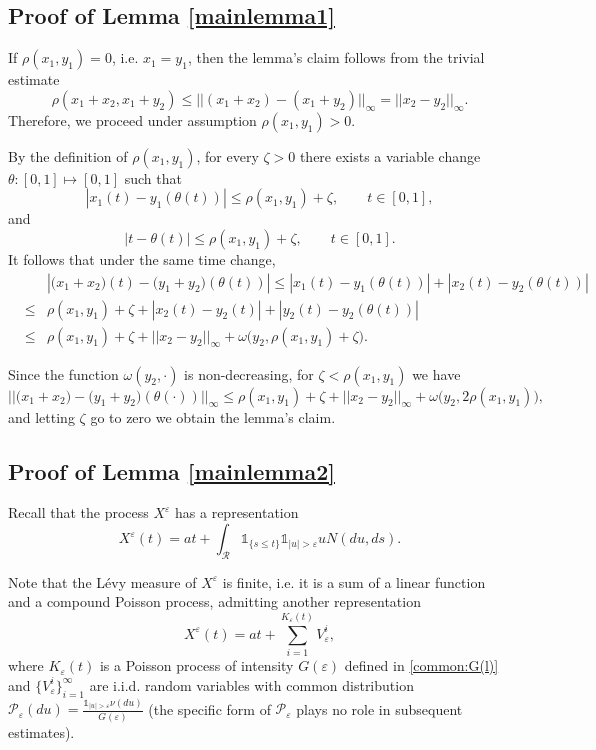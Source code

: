 \documentclass[12pt]{article}
\let\ep\varepsilon
\newcommand\PP{\mathcal P}
\newcommand\ro{\rho}
\newcommand\RR{\mathcal R}
\let\le\leqslant
\theoremstyle{definition}
\begin{document}
\subsection{Proof of Lemma \ref{mainlemma1}}
If $\ro(x_1,y_1)=0$, i.e. $x_1=y_1$, then the lemma's claim follows from the trivial estimate
\[
  \ro(x_1+x_2,x_1+y_2) \le || (x_1+x_2) -(x_1+y_2)||_\infty =  || x_2 -y_2||_\infty.
\]
Therefore, we proceed under assumption $\ro(x_1,y_1)>0$.
    
By the definition of $\ro(x_1,y_1)$, for every $\zeta > 0$ there exists a variable change
$\theta: [0,1]\mapsto[0,1]$ such that
\[
     |x_1(t) - y_1(\theta(t))| \le \ro(x_1, y_1) + \zeta, \qquad t\in[0,1],
\] 
and
\[ 
     |t - \theta(t)|\le \ro(x_1,y_1)+\zeta,      \qquad t\in[0,1].
\]
It follows that under the same time change,
\begin{eqnarray*}
  &&   |\big(x_1 + x_2\big)(t) - \big(y_1 + y_2\big)(\theta(t))| 
     \le |x_1(t) - y_1(\theta(t))| + |x_2(t) - y_2(\theta(t))|
\\
     &\le& \ro(x_1, y_1) + \zeta + |x_2(t) - y_2(t)| + |y_2(t) - y_2(\theta(t))|
\\
     &\le& \ro(x_1, y_1) + \zeta + ||x_2 - y_2||_\infty + \omega\big(y_2, \ro(x_1, y_1) + \zeta\big).
\end{eqnarray*}

Since the function $\omega(y_2,\cdot)$ is non-decreasing, for $\zeta < \ro(x_1,y_1)$ we have
\[
    ||\big(x_1 + x_2\big) - \big(y_1 + y_2\big)(\theta(\cdot))||_\infty
    \le \ro(x_1, y_1) + \zeta + ||x_2 - y_2||_\infty + \omega\big(y_2, 2\ro(x_1, y_1)\big),
\]
and letting $\zeta$ go to zero we obtain the lemma's claim.


\subsection{Proof of Lemma \ref{mainlemma2}}
        
Recall that the process $X^\ep$ has a representation
\[
    X^\ep(t) = at + \int_{\RR}\mathds{1}_{\{s \le t\}}\mathds{1}_{|u| > \ep}u N(du, ds).
\]  
       
Note that the L\'evy measure of $X^\ep$ is finite, i.e. it is a sum of a linear function and a compound Poisson process, admitting another representation
\begin{equation*}
            X^\ep(t) = at + \sum_{i = 1}^{K_\ep(t)} V_\ep^i,
\end{equation*}
where $K_\ep(t)$ is a Poisson process of intensity $G(\ep)$ defined in \eqref{common:G(l)} and
$\{V_\ep^i\}_{i = 1}^{\infty}$ are i.i.d. random variables with common distribution
$\PP_\ep(du) = \frac{\mathds{1}_{|u| > \ep}\nu(du)}{G(\ep)}$ 
(the specific form of $\PP_\ep$ plays no role in subsequent estimates).
\end{document}
